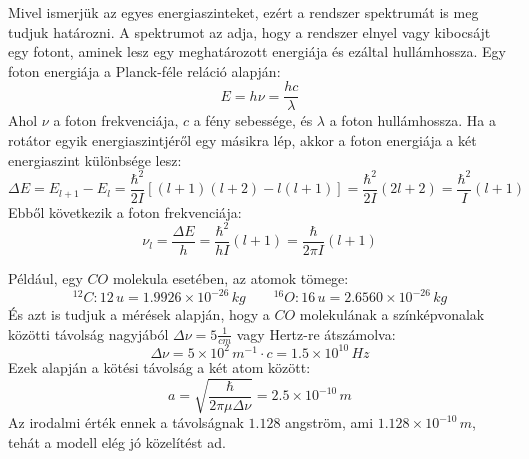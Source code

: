 \documentclass[../main.tex]{subfiles}
\begin{document}
Mivel ismerjük az egyes energiaszinteket, ezért a rendszer spektrumát is meg tudjuk határozni. A spektrumot az adja, hogy a rendszer elnyel vagy kibocsájt egy fotont, aminek lesz egy meghatározott energiája és ezáltal hullámhossza.
Egy foton energiája a Planck-féle reláció alapján:
\begin{equation}
    E = h \nu = \frac{hc}{\lambda}
\end{equation}
Ahol $\nu$ a foton frekvenciája, $c$ a fény sebessége, és $\lambda$ a foton hullámhossza. Ha a rotátor egyik energiaszintjéről egy másikra lép, akkor a foton energiája a két energiaszint különbsége lesz:
\begin{equation}
    \Delta E = E_{l + 1} - E_{l} = \frac{\hbar^2}{2I} \left[ (l+1) (l + 2) - l (l + 1) \right] = \frac{\hbar^2}{2I} (2l + 2) = \frac{\hbar^2}{I} (l + 1)
\end{equation}
Ebből következik a foton frekvenciája:
\begin{equation}
    \nu_l = \frac{\Delta E}{h} = \frac{\hbar^2}{h I} (l + 1) = \frac{\hbar}{2 \pi I} (l + 1)
\end{equation}

Például, egy $CO$ molekula esetében, az atomok tömege:
\begin{equation}
    ^{12}C: 12 \, u = 1.9926 \times 10^{-26} \, kg \qquad ^{16}O: 16 \, u = 2.6560 \times 10^{-26} \, kg
\end{equation}
És azt is tudjuk a mérések alapján, hogy a $CO$ molekulának a színképvonalak közötti távolság nagyjából $\Delta \nu = 5 \frac{1}{cm}$ vagy Hertz-re átszámolva:
\begin{equation}
    \Delta \nu = 5 \times 10^2 \, m^{-1} \cdot c = 1.5 \times 10^{10} \, Hz
\end{equation}
Ezek alapján a kötési távolság a két atom között:
\begin{equation}
    a = \sqrt{\frac{\hbar}{2 \pi \mu \Delta \nu}} = 2.5 \times 10^{-10} \, m
\end{equation}
Az irodalmi érték ennek a távolságnak $1.128$ angström, ami $1.128 \times 10^{-10} \, m$, tehát a modell elég jó közelítést ad.
\end{document}
